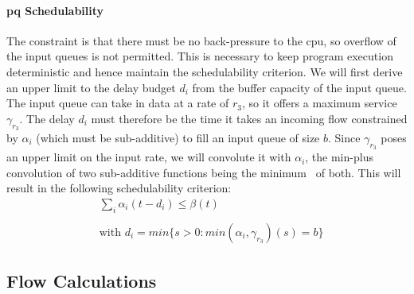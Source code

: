 \paragraph{\gls{pq} Schedulability}
The constraint is that there must be no back-pressure to the \gls{cpu}, so overflow of the input queues is not permitted.
This is necessary to keep program execution deterministic and hence maintain the schedulability criterion.
We will first derive an upper limit to the delay budget $d_i$ from the buffer capacity of the input queue. The input queue can take in data at a rate of $r_3$, so it offers a maximum service $\gamma_{r_3}$.
The delay $d_i$ must therefore be the time it takes an incoming flow constrained by $\alpha_i$ (which must be sub-additive) to fill an input queue of size $b$. Since $\gamma_{r_3}$ poses an upper limit on the input rate, we will
convolute it with $\alpha_i$, the min-plus convolution of two sub-additive functions being the minimum~\cite[p. 113]{thiran_network_2001} of both. This will result in the following schedulability criterion:
%
\begin{equation}
\begin{aligned}
&\sum_i \alpha_i(t-d_i) \le \beta(t)\\
\\
&\text{with~} d_i = min\{ s > 0 : min(\alpha_i, \gamma_{r_3})(s) = b\}
\label{eq:pq_min_d}
\end{aligned}
\end{equation}
%
\iffalse

\subsection{Flow Calculations}

